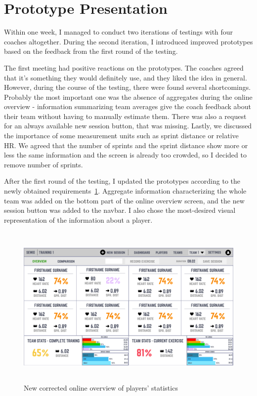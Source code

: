 \section{Prototype Presentation}
Within one week, I managed to conduct two iterations of testings with four coaches altogether. During the second iteration, I introduced improved prototypes based on the feedback from the first round of the testing.

The first meeting had positive reactions on the prototypes. The coaches agreed that it’s something they would definitely use, and they liked the idea in general. However, during the course of the testing, there were found several shortcomings. Probably the most important one was the absence of aggregates during the online overview - information summarizing team averages give the coach feedback about their team without having to manually estimate them. There was also a request for an always available new session button, that was missing. Lastly, we discussed the importance of some measurement units such as sprint distance or relative HR. We agreed that the number of sprints and the sprint distance show more or less the same information and the screen is already too crowded, so I decided to remove number of sprints.

After the first round of the testing, I updated the prototypes according to the newly obtained requirements~\ref{img:online_after}. Aggregate information characterizing the whole team was added on the bottom part of the online overview screen, and the new session button was added to the navbar. I also chose the most-desired visual representation of the information about a player.

\begin{figure}[htb]
\begin{center}
  \includegraphics*[width=14cm,height=8cm,keepaspectratio]{images/online_after}
\end{center}
\caption{New corrected online overview of players’ statistics}
\label{img:online_after}
\end{figure}

